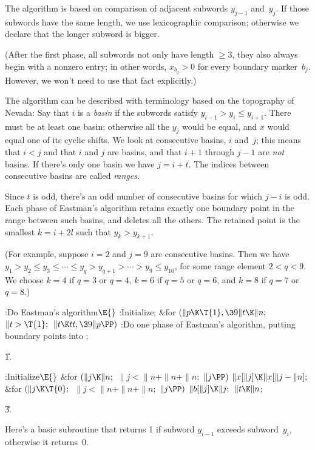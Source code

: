 The algorithm is based on comparison of adjacent subwords $y_{j-1}$ and~$y_j$.
If those subwords have the same length, we use lexicographic comparison;
otherwise we declare that the longer subword is bigger.

(After the first phase, all subwords not only have length $\ge3$, they also
always begin with a nonzero entry; in other words, $x_{b_j}>0$ for every
boundary marker~$b_j$. However, we won't need to use that fact explicitly.)

The algorithm can be described with terminology based on the topography
of Nevada: Say that $i$ is a {\it basin\/} if the subwords satisfy
$y_{i-1}>y_i\le y_{i+1}$. There must be at least one basin; otherwise all
the $y_j$ would be equal, and $x$ would equal one of its cyclic shifts.
We look at consecutive basins, $i$ and~$j$; this means that $i<j$ and that
$i$ and $j$ are basins, and that $i+1$ through $j-1$ are {\it not\/} basins.
If there's only one basin we have $j=i+t$.
The indices between consecutive basins are called {\it ranges\/}.

Since $t$ is odd, there's an odd number of consecutive basins for which
$j-i$ is odd. Each phase of Eastman's algorithm retains exactly one boundary
point in the range between such basins, and deletes all the others.
The retained point is the smallest $k=i+2l$ such that $y_k>y_{k+1}$.

(For example, suppose $i=2$ and $j=9$ are consecutive basins. Then we have
$y_1>y_2\le y_3\le\cdots\le y_q>y_{q+1}>\cdots>y_9\le y_{10}$, for some
range element $2<q<9$. We choose $k=4$ if $q=3$ or $q=4$,
$k=6$ if $q=5$ or $q=6$, and $k=8$ if $q=7$ or $q=8$.)

\Y\B\4:Do Eastman's algorithm\X${}\E{}$\6
:Initialize\X;\6
\&{for} ${}(\|p\K\T{1},\39\|t\K\|n;{}$ ${}\|t>\T{1};{}$ ${}\|t\K\\{tt},\39\|p%
\PP){}$\1\5
:Do one phase of Eastman's algorithm, putting  boundary points
into \X;\2\par
\U1.\fi

\B{}:Initialize\X${}\E{}$\6
\&{for} ${}(\|j\K\|n;{}$ ${}\|j<\|n+\|n+\|n;{}$ ${}\|j\PP){}$\1\5
${}\|x[\|j]\K\|x[\|j-\|n];{}$\2\6
\&{for} ${}(\|j\K\T{0};{}$ ${}\|j<\|n+\|n+\|n;{}$ ${}\|j\PP){}$\1\5
${}\|b[\|j]\K\|j;{}$\2\6
${}\|t\K\|n{}$;\par
\U3.\fi

Here's a basic subroutine that returns 1 if
subword $y_{i-1}$ exceeds
subword~$y_i$, otherwise it returns~0.

